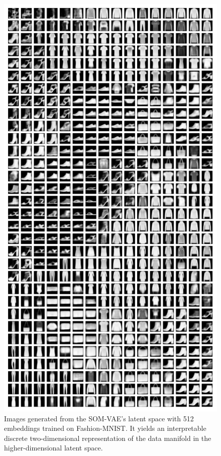 \begin{figure}[h]
    \centering
    \includegraphics[height=0.8\textheight]{FMNIST_SOM.pdf}
    \caption{Images generated from the SOM-VAE's latent space with 512 embeddings trained on Fashion-MNIST. It yields an interpretable discrete two-dimensional representation of the data manifold in the higher-dimensional latent space.}
    \label{fig:FMNIST_SOM}
\end{figure}






